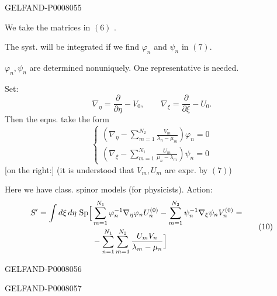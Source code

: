 \begin{GelfandAdjacentEvidence}{GELFAND-P000805}{5}


We take the matrices in \((6)\) .

The syst. will be integrated if we find \(\varphi_n\) and \(\psi_n\) in \((7)\).

\(\varphi_n,\psi_n\) are determined nonuniquely. One representative is needed.

Set:
\begin{equation*}
\nabla_\eta=\frac{\partial}{\partial\eta}-V_0,\qquad
\nabla_\xi=\frac{\partial}{\partial\xi}-U_0.
\tag{8}
\end{equation*}
Then the eqns. take the form
\begin{equation*}
\begin{cases}
\displaystyle\left(\nabla_\eta-\sum_{m=1}^{N_2}\frac{V_m}{\lambda_n-\mu_m}\right)\varphi_n=0\\[1.5ex]
\displaystyle\left(\nabla_\xi-\sum_{m=1}^{N_1}\frac{U_m}{\mu_n-\lambda_m}\right)\psi_n=0
\end{cases}
\tag{9}
\end{equation*}
[on the right:] (it is understood that \(V_m,U_m\) are expr. by \((7)\))

Here we have class. spinor models (for physicists). Action:
\begin{equation*}
\begin{aligned}
S'=\int d\xi\,d\eta\,\operatorname{Sp}\Bigl[
 &\sum_{m=1}^{N_1}\varphi_n^{-1}\nabla_\eta\varphi_n U_n^{(0)}
 -\sum_{m=1}^{N_2}\psi_n^{-1}\nabla_\xi\psi_n V_n^{(0)}=\\
 &-\sum_{n=1}^{N_1}\sum_{m=1}^{N_2}\frac{U_m V_n}{\lambda_m-\mu_n}\Bigr]
\end{aligned}
\tag{10}
\end{equation*}
\end{GelfandAdjacentEvidence}
\begin{GelfandAdjacentEvidence}{GELFAND-P000805}{6}

\end{GelfandAdjacentEvidence}
\begin{GelfandAdjacentEvidence}{GELFAND-P000805}{7}

\end{GelfandAdjacentEvidence}



